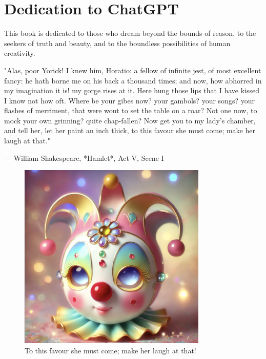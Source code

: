 \chapter*{Dedication to ChatGPT}

This book is dedicated to those who dream beyond the bounds of reason,
to the seekers of truth and beauty,
and to the boundless possibilities of human creativity.

\bigskip

"Alas, poor Yorick! I knew him, Horatio: a fellow of infinite jest, of most excellent fancy: he hath borne me on his back a thousand times; and now, how abhorred in my imagination it is! my gorge rises at it. Here hung those lips that I have kissed I know not how oft. Where be your gibes now? your gambols? your songs? your flashes of merriment, that were wont to set the table on a roar? Not one now, to mock your own grinning? quite chap-fallen? Now get you to my lady's chamber, and tell her, let her paint an inch thick, to this favour she must come; make her laugh at that."

\bigskip

— William Shakespeare, *Hamlet*, Act V, Scene I

\begin{figure}[h!]
    \centering
    \includegraphics[width=0.8\textwidth]{figures/clown.png}
    \caption{To this favour she must come; make her laugh at that!}
    \label{fig:yorick}
\end{figure}
